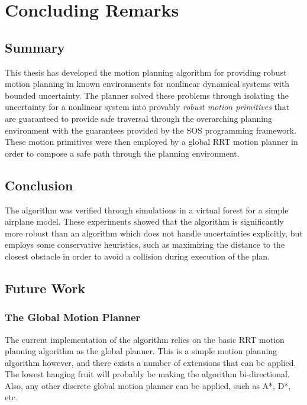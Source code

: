 \chapter{Concluding Remarks}
\label{chp:concluding-remarks}

\section{Summary}

This thesis has developed the \rrtfunnel{} motion planning algorithm for
providing robust motion planning in known environments for nonlinear dynamical
systems with bounded uncertainty. The planner solved these problems through
isolating the uncertainty for a nonlinear system into provably \textit{robust
  motion primitives} that are guaranteed to provide safe traversal through the
overarching planning environment with the guarantees provided by the \ac{SOS}
programming framework. These motion primitives were then employed by a global
\ac{RRT} motion planner in order to compose a safe path through the planning
environment.

\section{Conclusion}

The algorithm was verified through simulations in a virtual forest for a simple
airplane model. These experiments showed that the \rrtfunnel{} algorithm is
significantly more robust than an algorithm which does not handle uncertainties
explicitly, but employs some conservative heuristics, such as maximizing the
distance to the closest obstacle in order to avoid a collision during execution
of the plan.


\section{Future Work}

\subsection{The Global Motion Planner}

The current implementation of the \rrtfunnel{} algorithm relies on the basic
\ac{RRT} motion planning algorithm as the global planner. This is a simple
motion planning algorithm however, and there exists a number of extensions that
can be applied. The lowest hanging fruit will probably be making the algorithm
bi-directional. Also, any other discrete global motion planner can be applied,
such as A*, D*, etc.

